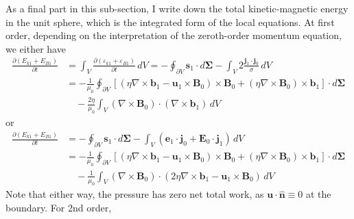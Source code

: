 As a final part in this sub-section, I write down the total kinetic-magnetic energy in the unit sphere, which is the integrated form of the local equations. At first order, depending on the interpretation of the zeroth-order momentum equation, we either have
%
\begin{equation}
\begin{aligned}
    \frac{\partial (E_{k1} + E_{B1})}{\partial t} &= \int_V \frac{\partial (\varepsilon_{k1} + \varepsilon_{B1})}{\partial t} \, dV = - \oint_{\partial V} \mathbf{s}_1\cdot d\boldsymbol{\Sigma} - \int_V 2 \frac{\mathbf{j}_1\cdot \mathbf{j}_0}{\sigma}\, dV \\ 
    &= - \frac{1}{\mu_0} \oint_{\partial V} \left[(\eta \nabla\times \mathbf{b}_1 - \mathbf{u}_1\times\mathbf{B}_0)\times \mathbf{B}_0 + (\eta\nabla\times \mathbf{B}_0) \times \mathbf{b}_1\right]\cdot d\boldsymbol{\Sigma} \\
    &\quad - \frac{2\eta}{\mu_0} \int_V (\nabla\times \mathbf{B}_0)\cdot (\nabla\times \mathbf{b}_1) \, dV
\end{aligned}
\end{equation}
%
or 
%
\begin{equation}
    \begin{aligned}
        \frac{\partial (E_{k1} + E_{B1})}{\partial t} &= - \oint_{\partial V} \mathbf{s}_1\cdot d\boldsymbol{\Sigma} - \int_V (\mathbf{e}_1\cdot \mathbf{j}_0 + \mathbf{E}_0\cdot \mathbf{j}_1)\, dV \\ 
        &= - \frac{1}{\mu_0} \oint_{\partial V} \left[(\eta \nabla\times \mathbf{b}_1 - \mathbf{u}_1\times\mathbf{B}_0)\times \mathbf{B}_0 + (\eta\nabla\times \mathbf{B}_0) \times \mathbf{b}_1\right]\cdot d\boldsymbol{\Sigma} \\
        &\quad - \frac{1}{\mu_0} \int_V (\nabla\times \mathbf{B}_0)\cdot (2\eta\nabla\times \mathbf{b}_1 - \mathbf{u}_1\times \mathbf{B}_0)\, dV
    \end{aligned}
\end{equation}
%
Note that either way, the pressure has zero net total work, as $\mathbf{u}\cdot \hat{\mathbf{n}}\equiv 0$ at the boundary. For 2nd order,
%
